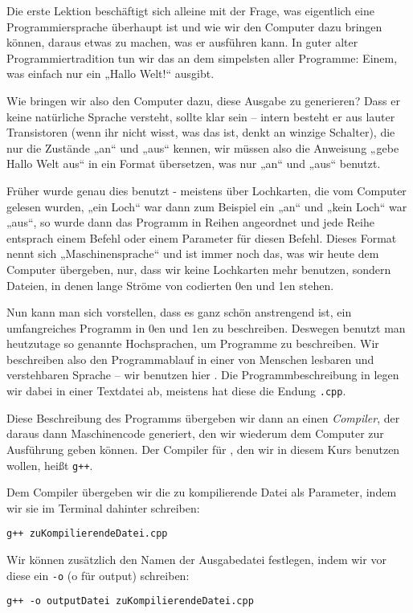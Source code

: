 
Die erste Lektion beschäftigt sich alleine mit der Frage, was eigentlich eine
Programmiersprache überhaupt ist und wie wir den Computer dazu bringen können,
daraus etwas zu machen, was er ausführen kann.  In guter alter
Programmiertradition tun wir das an dem simpelsten aller Programme: Einem, was
einfach nur ein „Hallo Welt!“ ausgibt.

Wie bringen wir also den Computer dazu, diese Ausgabe zu generieren? Dass er
keine natürliche Sprache versteht, sollte klar sein -- intern besteht er aus
lauter Transistoren (wenn ihr nicht wisst, was das ist, denkt an winzige
Schalter), die nur die Zustände „an“ und „aus“ kennen, wir müssen also die
Anweisung „gebe Hallo Welt aus“ in ein Format übersetzen, was nur „an“ und
„aus“ benutzt.

Früher wurde genau dies benutzt - meistens über Lochkarten, die vom Computer
gelesen wurden, „ein Loch“ war dann zum Beispiel ein „an“ und „kein Loch“ war
„aus“, so wurde dann das Programm in Reihen angeordnet und jede Reihe entsprach
einem Befehl oder einem Parameter für diesen Befehl.  Dieses Format nennt sich
„Maschinensprache“ und ist immer noch das, was wir heute dem Computer
übergeben, nur, dass wir keine Lochkarten mehr benutzen, sondern Dateien, in
denen lange Ströme von codierten 0en und 1en stehen.

Nun kann man sich vorstellen, dass es ganz schön anstrengend ist, ein
umfangreiches Programm in 0en und 1en zu beschreiben. Deswegen benutzt man
heutzutage so genannte Hochsprachen, um Programme zu beschreiben. Wir
beschreiben also den Programmablauf in einer von Menschen lesbaren und
verstehbaren Sprache -- wir benutzen hier \Cpp.  Die Programmbeschreibung in
\Cpp legen wir dabei in einer Textdatei ab, meistens hat diese die Endung
\texttt{.cpp}.

Diese Beschreibung des Programms übergeben wir dann an einen \emph{Compiler},
der daraus dann Maschinencode generiert, den wir wiederum dem Computer zur
Ausführung geben können.  Der Compiler für \Cpp, den wir in diesem Kurs
benutzen wollen, heißt \texttt{g++}.

Dem Compiler übergeben wir die zu kompilierende Datei als Parameter, indem wir
sie im Terminal dahinter schreiben:
\begin{center}
    \texttt{g++ zuKompilierendeDatei.cpp}
\end{center}
Wir können zusätzlich den Namen der Ausgabedatei festlegen, indem wir vor diese
ein \texttt{-o} (o für output) schreiben:
\begin{center}
    \texttt{g++ -o outputDatei zuKompilierendeDatei.cpp}
\end{center}

